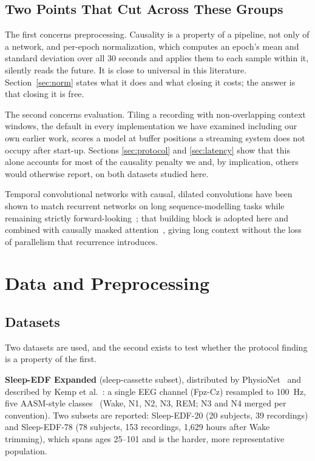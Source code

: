 \documentclass[conference]{IEEEtran}
\begin{document}
\subsection{Two Points That Cut Across These Groups}

The first concerns preprocessing. Causality is a property of a pipeline, not only of a network,
and per-epoch normalization, which computes an epoch's mean and standard deviation over all 30
seconds and applies them to each sample within it, silently reads the future. It is close to
universal in this literature. Section~\ref{sec:norm} states what it does and what closing it
costs; the answer is that closing it is free.

The second concerns evaluation. Tiling a recording with non-overlapping context windows, the
default in every implementation we have examined including our own earlier work, scores a model at
buffer positions a streaming system does not occupy after start-up. Sections \ref{sec:protocol}
and \ref{sec:latency} show that this alone accounts for most of the causality penalty we and, by
implication, others would otherwise report, on both datasets studied here.

Temporal convolutional networks with causal, dilated convolutions have been shown to match
recurrent networks on long sequence-modelling tasks while remaining strictly
forward-looking~\cite{tcn}; that building block is adopted here and combined with causally masked
attention~\cite{attention}, giving long context without the loss of parallelism that recurrence
introduces.

\section{Data and Preprocessing}

\subsection{Datasets}
\label{sec:datasets}

Two datasets are used, and the second exists to test whether the protocol finding is a property of
the first.

\textbf{Sleep-EDF Expanded} (sleep-cassette subset), distributed by PhysioNet~\cite{physionet} and
described by Kemp et al.~\cite{kemp}: a single EEG channel (Fpz-Cz) resampled to 100~Hz, five
AASM-style classes~\cite{aasm} (Wake, N1, N2, N3, REM; N3 and N4 merged per convention). Two
subsets are reported: Sleep-EDF-20 (20 subjects, 39 recordings) and Sleep-EDF-78 (78 subjects, 153
recordings, 1{,}629 hours after Wake trimming), which spans ages 25--101 and is the harder, more
representative population.
\end{document}
